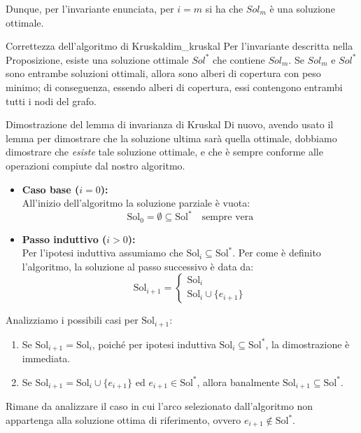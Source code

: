 \documentclass[12pt]{report}
\begin{document}
	Dunque, per l'invariante enunciata, per $i = m$ si ha che $Sol_m$ è una soluzione ottimale.
	
	\begin{dimostrazione}{Correttezza dell'algoritmo di Kruskal}{dim_kruskal}
		Per l'invariante descritta nella Proposizione, esiste una soluzione ottimale $Sol^*$ che contiene $Sol_m$.
		Se $Sol_m$ e $Sol^*$ sono entrambe soluzioni ottimali, allora sono alberi di copertura con peso minimo; di conseguenza, essendo alberi di copertura, essi contengono entrambi tutti i nodi del grafo.
	\end{dimostrazione}
	
	\begin{dimostrazione}{Dimostrazione del lemma di invarianza di Kruskal}{}
		Di nuovo, avendo usato il lemma per dimostrare che la soluzione ultima sarà quella ottimale, dobbiamo dimostrare che \textit{esiste} tale soluzione ottimale, e che è sempre conforme alle operazioni compiute dal nostro algoritmo.
		\begin{itemize}
			\item \textbf{Caso base ($i = 0$):}\\
			All'inizio dell'algoritmo la soluzione parziale è vuota:
			\[
			\text{Sol}_0 = \emptyset \subseteq \text{Sol}^* \quad \text{sempre vera}
			\]
			
			\item \textbf{Passo induttivo ($i > 0$):}\\
			Per l'ipotesi induttiva assumiamo che $\text{Sol}_i \subseteq \text{Sol}^*$. Per come è definito l'algoritmo, la soluzione al passo successivo è data da:
			\[
			\text{Sol}_{i+1} = \begin{cases}
				\text{Sol}_i \\
				\text{Sol}_i \cup \{e_{i+1}\}
			\end{cases}
			\]
		\end{itemize}
		
		Analizziamo i possibili casi per $\text{Sol}_{i+1}$:
		\begin{enumerate}
			\item Se $\text{Sol}_{i+1} = \text{Sol}_i$, poiché per ipotesi induttiva $\text{Sol}_i \subseteq \text{Sol}^*$, la dimostrazione è immediata.
			\item Se $\text{Sol}_{i+1} = \text{Sol}_i \cup \{e_{i+1}\}$ ed $e_{i+1} \in \text{Sol}^*$, allora banalmente $\text{Sol}_{i+1} \subseteq \text{Sol}^*$.
		\end{enumerate}
		
		Rimane da analizzare il caso in cui l'arco selezionato dall'algoritmo non appartenga alla soluzione ottima di riferimento, ovvero $e_{i+1} \notin \text{Sol}^*$.
		

\end{dimostrazione}
\end{document}
